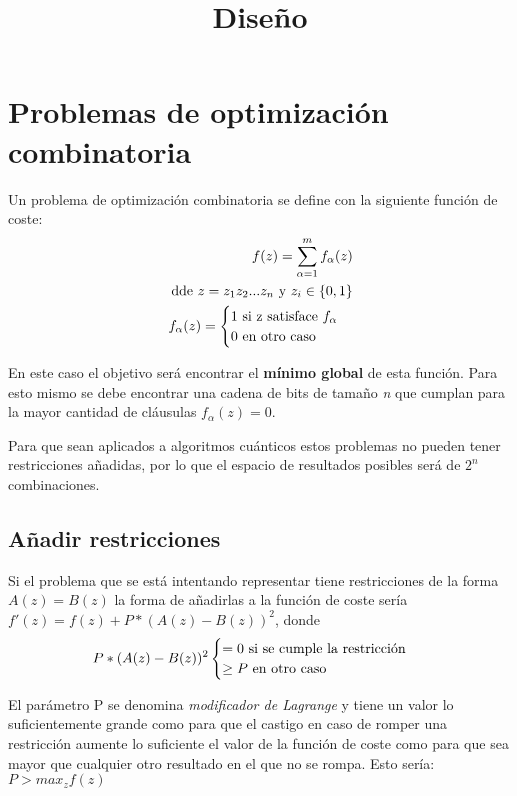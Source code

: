 \documentclass{article}
\title{Diseño}
\begin{document}
\maketitle{}

\section{Problemas de optimización combinatoria}

Un problema de optimización combinatoria se define con la siguiente función de coste:
\begin{align*}
  f(z) = \sum_{\alpha = 1}^{m} f_\alpha(z) \\
  \textnormal{ dde } z = z_1z_2...z_n \textnormal{ y } z_i\in{\{0, 1\}} \\
   f_{\alpha}(z) = \begin{cases}
     1 \textnormal{ si z satisface } f_\alpha \\
     0 \textnormal{ en otro caso}
   \end{cases}
\end{align*}

En este caso el objetivo será encontrar el \textbf{mínimo global} de esta función. Para esto mismo se debe encontrar una cadena de bits de tamaño \textit{n} que cumplan para la mayor cantidad de cláusulas $f_\alpha(z) = 0$.

Para que sean aplicados a algoritmos cuánticos estos problemas no pueden tener restricciones añadidas, por lo que el espacio de resultados posibles será de $2^n$ combinaciones.

\subsection{Añadir restricciones}

Si el problema que se está intentando representar tiene restricciones de la forma $A(z) = B(z)$ la forma de añadirlas a la función de coste sería $f'(z) = f(z) + P*(A(z)-B(z))^2$, donde
\begin{align*}
  P*(A(z) - B(z))^2 \begin{cases}
    = 0 \textnormal{ si se cumple la restricción } \\
    \ge P \textnormal{ en otro caso }
  \end{cases}
\end{align*}

El parámetro P se denomina \textit{modificador de Lagrange} y tiene un valor lo suficientemente grande como para que el castigo en caso de romper una restricción aumente lo suficiente el valor de la función de coste como para que sea mayor que cualquier otro resultado en el que no se rompa. Esto sería: $P > max_zf(z)$
\end{document}
